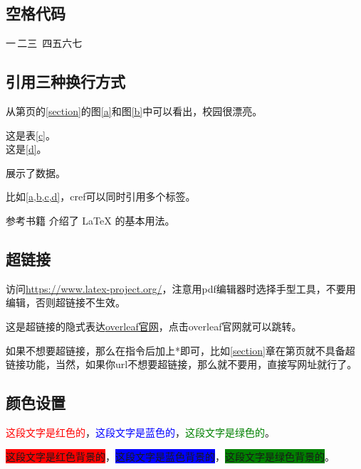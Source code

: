 \documentclass[draft,14pt]{extarticle}%
\begin{document}
\subsection{空格代码}
一\,二\;三\ 四\quad 五\qquad 六\hspace{5cm}七

\subsection{引用\raisebox{2pt}{+}三种换行方式}
从第\pageref{section}页的\ref{section}的图\eqref{a}和图\eqref{b}中可以看出，校园很漂亮。\par
这是表\eqref{c}。\\
\indent 这是\cref{d}。%

展示了数据。%

比如\cref{a,b,c,d}，cref可以同时引用多个标签。

参考书籍 \cite{einstein1905} 介绍了 LaTeX 的基本用法。%

\subsection{超链接}
访问\url{https://www.latex-project.org/}，注意用pdf编辑器时选择手型工具，不要用编辑，否则超链接不生效。

这是超链接的隐式表达\href{https://www.overleaf.com/}{overleaf官网}，点击overleaf官网就可以跳转。%

如果不想要超链接，那么在指令后加上*即可，比如\ref*{section}章在第\pageref*{section}页就不具备超链接功能，当然，如果你url不想要超链接，那么就不要用\url{}，直接写网址就行了。
 
\subsection{颜色设置}
\textcolor{red}{这段文字是红色的}，\textcolor{blue}{这段文字是蓝色的}，\textcolor{green}{这段文字是绿色的}。

\colorbox{red}{这段文字是红色背景的}，\colorbox{blue}{这段文字是蓝色背景的}，\colorbox{green}{这段文字是绿色背景的}。
\end{document}
